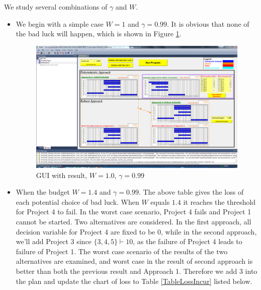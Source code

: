 \documentclass[final,3p,times]{elsarticle}
\begin{document}
We study several combinations of $\gamma$ and $W$. 
\begin{itemize}
	\item We begin with a simple case $W=1$ and $\gamma=0.99$. It is obvious that none of the bad luck will happen, which is shown in Figure \ref{FigData1hp990w1p000}.
	
		\begin{figure}[H]
			\centering
			\includegraphics[trim=95mm 45mm 5mm 25mm, clip, width=15cm]{Data1hp990w1p000.png}
			\caption{GUI with result, $W=1.0$, $\gamma=0.99$}
			\label{FigData1hp990w1p000}
		\end{figure}
	
	\item When the budget $W=1.4$ and $\gamma=0.99$. The above table gives the loss of each potential choice of bad luck. When $W$ equals $1.4$ it reaches the threshold for Project 4 to fail. In the worst case scenario, Project 4 fails and Project 1 cannot be started. Two alternatives are considered. In the first approach, all decision variable for Project 4 are fixed to be 0, while in the second approach, we'll add Project 3 since $\{3,4,5\}\vdash 10$, as the failure of Project 4 leads to failure of Project 1. The worst case scenario of the results of the two alternatives are examined, and worst case in the result of second approach is better than both the previous result and Approach 1. Therefore we add 3 into the plan and update the chart of loss to Table \ref{TableLossIncur} listed below.


\end{itemize}
\end{document}
